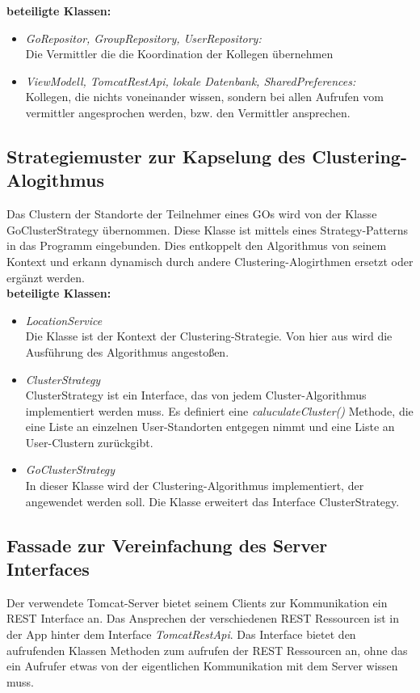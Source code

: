\documentclass[parskip=full]{scrartcl}
\begin{document}
\textbf{beteiligte Klassen:}
\begin{itemize}
	\item \textit{GoRepositor, GroupRepository, UserRepository:}\\
	 Die Vermittler die die Koordination der Kollegen übernehmen
	\item \textit{ViewModell, TomcatRestApi, lokale Datenbank, SharedPreferences:}\\ Kollegen, die nichts voneinander wissen, sondern bei allen Aufrufen vom vermittler angesprochen werden, bzw. den Vermittler ansprechen.
\end{itemize}

\subsection{Strategiemuster zur Kapselung des Clustering-Alogithmus}
Das Clustern der Standorte der Teilnehmer eines GOs wird von der Klasse GoClusterStrategy übernommen. Diese Klasse ist mittels eines Strategy-Patterns in das Programm eingebunden. Dies entkoppelt den Algorithmus von seinem Kontext und erkann dynamisch durch andere Clustering-Alogirthmen ersetzt oder ergänzt werden. \\

\textbf{beteiligte Klassen:}
\begin{itemize}
	\item \textit{LocationService} \\
	Die Klasse ist der Kontext der Clustering-Strategie. Von hier aus wird die Ausführung des Algorithmus angestoßen.
	\item \textit{ClusterStrategy} \\
	ClusterStrategy ist ein Interface, das von jedem Cluster-Algorithmus implementiert werden muss. Es definiert eine \textit{caluculateCluster()} Methode, die eine Liste an einzelnen User-Standorten entgegen nimmt und eine Liste an User-Clustern zurückgibt.
	\item \textit{GoClusterStrategy} \\
	In dieser Klasse wird der Clustering-Algorithmus implementiert, der angewendet werden soll. Die Klasse erweitert das Interface ClusterStrategy.
\end{itemize}

\subsection{Fassade zur Vereinfachung des Server Interfaces}
Der verwendete Tomcat-Server bietet seinem Clients zur Kommunikation ein REST Interface an. Das Ansprechen der verschiedenen REST Ressourcen ist in der App hinter dem Interface \textit{TomcatRestApi}. Das Interface bietet den aufrufenden Klassen Methoden zum aufrufen der REST Ressourcen an, ohne das ein Aufrufer etwas von der eigentlichen Kommunikation mit dem Server wissen muss. \\
\end{document}
